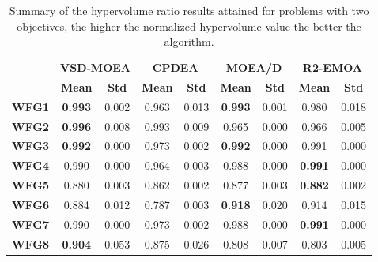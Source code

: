 \begin{table*}[t]
\caption{Summary of the hypervolume ratio results attained for problems with two objectives, the higher the normalized hypervolume value the better the algorithm.}
\label{tab:StatisticsHV_2obj}
\begin{tabular}{c c|c|c|c|c|c|c|c}
\cline{2-9}
\textbf{}      & \multicolumn{2}{c|}{\textbf{VSD-MOEA}} & \multicolumn{2}{c|}{\textbf{CPDEA}} & \multicolumn{2}{c|}{\textbf{MOEA/D}} & \multicolumn{2}{c}{\textbf{R2-EMOA}} \\ \cline{2-9} 
\textbf{}      & \textbf{Mean}       & \textbf{Std}     & \textbf{Mean}     & \textbf{Std}    & \textbf{Mean}      & \textbf{Std}    & \textbf{Mean}      & \textbf{Std}     \\ \hline
\textbf{WFG1}  & \textbf{0.993}      & 0.002            & 0.963             & 0.013           & \textbf{0.993}     & 0.001           & 0.980              & 0.018            \\ \hline
\textbf{WFG2}  & \textbf{0.996}      & 0.008            & 0.993             & 0.009           & 0.965              & 0.000           & 0.966              & 0.005            \\ \hline
\textbf{WFG3}  & \textbf{0.992}      & 0.000            & 0.973             & 0.002           & \textbf{0.992}     & 0.000           & 0.991              & 0.000            \\ \hline
\textbf{WFG4}  & 0.990               & 0.000            & 0.964             & 0.003           & 0.988              & 0.000           & \textbf{0.991}     & 0.000            \\ \hline
\textbf{WFG5}  & 0.880               & 0.003            & 0.862             & 0.002           & 0.877              & 0.003           & \textbf{0.882}     & 0.002            \\ \hline
\textbf{WFG6}  & 0.884               & 0.012            & 0.787             & 0.003           & \textbf{0.918}     & 0.020           & 0.914              & 0.015            \\ \hline
\textbf{WFG7}  & 0.990               & 0.000            & 0.973             & 0.002           & 0.988              & 0.000           & \textbf{0.991}     & 0.000            \\ \hline
\textbf{WFG8}  & \textbf{0.904}      & 0.053            & 0.875             & 0.026           & 0.808              & 0.007           & 0.803              & 0.005            \\ \hline

\end{tabular}
\end{table*}
